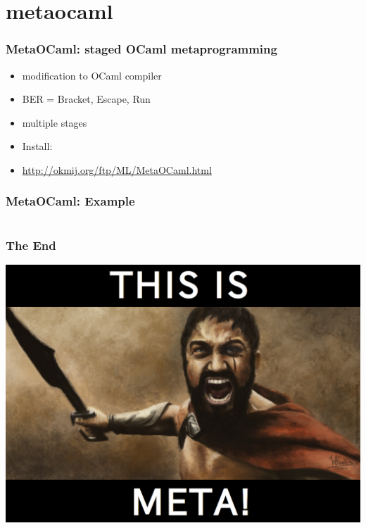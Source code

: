\section{metaocaml}

\begin{frame}
\frametitle{MetaOCaml: staged OCaml metaprogramming}
\begin{itemize}
\item modification to OCaml compiler
\item BER = Bracket, Escape, Run
\item multiple stages
\item Install: 
\item \url{http://okmij.org/ftp/ML/MetaOCaml.html}
\end{itemize}
\end{frame}

\begin{frame}
\frametitle{MetaOCaml: Example}

\end{frame}

\section{}

\begin{frame}
\frametitle{The End}
\centering
\includegraphics[height=0.85\textheight]{this-is-meta.png}
\end{frame}


